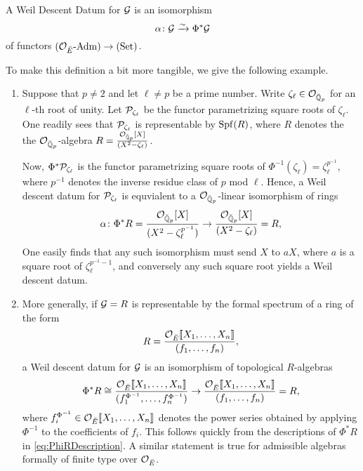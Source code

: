 \documentclass[../main.tex]{subfiles}
\begin{document}
\begin{defi}\label{def:WeilDescentDatum}
  A Weil Descent Datum for $\mathcal{G}$ is an isomorphism
  \begin{equation*}
    \alpha \colon \mathcal{G} \xrightarrow{\sim} \Phi^* \mathcal{G}
  \end{equation*}
  of functors ${({\mathcal{O}_{\breve {E}}}\text-\allowbreak\mathrm{Adm})} \to {(\mathrm{Set})}$.
\end{defi}

To make this definition a bit more tangible, we give the following example.
\begin{xpl}
  \begin{enumerate}
    \item Suppose that $p \neq 2$ and let $\ell \neq p$ be a prime number. Write 
  $\zeta_\ell \in \mathcal{O}_{{\breve {\mathbb{Q}}}_p}$ for an $\ell$-th root of unity. Let
  $\mathcal{P}_{\zeta_\ell}$ be the functor parametrizing
  square roots of $\zeta_\ell$. One readily sees that $\mathcal{P}_{\zeta_\ell}$ is
  representable by 
  $\operatorname{Spf}(R)$, where $R$ denotes the the $\mathcal{O}_{{\breve {\mathbb{Q}}}_p}$-algebra
  $R = \frac{\mathcal{O}_{{\breve {\mathbb{Q}}}_p}[X]}{(X^2 - \zeta_\ell)}$. 

  Now, $\Phi^*\mathcal{P}_{\zeta_\ell}$ is the functor
  parametrizing square roots of $\Phi^{-1}(\zeta_\ell) = \zeta_\ell^{p^{-1}}$,
  where $p^{-1}$ denotes the inverse residue class of $p$ mod $\ell$. 
  Hence, a Weil descent datum for $\mathcal{P}_{\zeta_\ell}$ is equvialent to a 
  $\mathcal{O}_{{\breve {\mathbb{Q}}}_p}$-linear isomorphism of rings
  \begin{equation*}
    \alpha \colon \Phi^* R = \frac{\mathcal{O}_{{\breve {\mathbb{Q}}}_p}[X]}{(X^2 - \zeta_\ell^{p^{-1}})} \to
    \frac{\mathcal{O}_{{\breve {\mathbb{Q}}}_p}[X]}{(X^2 - \zeta_\ell)} = R, 
  \end{equation*}
  One easily finds that any such isomorphism must send $X$ to $aX$, where $a$
  is a square root of $\zeta_\ell^{p^{-1}-1}$, and conversely any such square
  root yields a Weil descent datum.
    \item More generally, if $\mathcal{G} = R$ is representable by the formal spectrum of a 
      ring of the form
      \begin{equation*}
        R = \frac{ \mathcal{O}_{{\breve {E}}}\llbracket X_1, \dots, X_n \rrbracket}{(f_1, \dots,
        f_n)},
      \end{equation*} a Weil descent datum 
      for $\mathcal{G}$ is an isomorphism of topological $R$-algebras
      \begin{equation*}
        \Phi^* R \cong \frac{ \mathcal{O}_{{\breve {E}}} \llbracket X_1, \dots, X_n \rrbracket}{(f_1^{\Phi^{-1}},
        \dots, f_n^{\Phi^{-1}})}
        \to 
        \frac{ \mathcal{O}_{{\breve {E}}}\llbracket X_1, \dots, X_n \rrbracket}{(f_1, \dots,
        f_n)} = R,
      \end{equation*}
      where $f_i^{\Phi^{-1}} \in \mathcal{O}_{\breve {E}}\llbracket X_1, \dots, X_n\rrbracket$ denotes the 
      power series obtained by applying $\Phi^{-1}$ to the coefficients of $f_i$.
      This follows quickly from the descriptions of $\Phi^*R$ in
      \eqref{eq:PhiRDescription}. A similar statement is true for admissible algebras
      formally of finite type over $\mathcal{O}_{\breve {E}}$.
  \end{enumerate}
\end{xpl}
\end{document}
